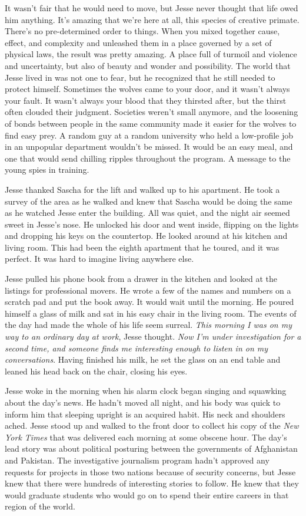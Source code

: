 \documentclass[12pt]{book}
\begin{document}
It wasn't fair that he would need to move, but Jesse never thought that life owed him anything.  It's amazing that we're here at all, this species of creative primate.  There's no pre-determined order to things.  When you mixed together cause, effect, and complexity and unleashed them in a place governed by a set of physical laws, the result was pretty amazing.  A place full of turmoil and violence and uncertainty, but also of beauty and wonder and possibility.  The world that Jesse lived in was not one to fear, but he recognized that he still needed to protect himself.  Sometimes the wolves came to your door, and it wasn't always your fault.  It wasn't always your blood that they thirsted after, but the thirst often clouded their judgment.  Societies weren't small anymore, and the loosening of bonds between people in the same community made it easier for the wolves to find easy prey.  A random guy at a random university who held a low-profile job in an unpopular department wouldn't be missed.  It would be an easy meal, and one that would send chilling ripples throughout the program.  A message to the young spies in training.

Jesse thanked Sascha for the lift and walked up to his apartment.  He took a survey of the area as he walked and knew that Sascha would be doing the same as he watched Jesse enter the building.  All was quiet, and the night air seemed sweet in Jesse's nose.  He unlocked his door and went inside, flipping on the lights and dropping his keys on the countertop.  He looked around at his kitchen and living room.  This had been the eighth apartment that he toured, and it was perfect.  It was hard to imagine living anywhere else.

Jesse pulled his phone book from a drawer in the kitchen and looked at the listings for professional movers.  He wrote a few of the names and numbers on a scratch pad and put the book away.  It would wait until the morning.  He poured himself a glass of milk and sat in his easy chair in the living room.  The events of the day had made the whole of his life seem surreal.  \emph{This morning I was on my way to an ordinary day at work}, Jesse thought.  \emph{Now I'm under investigation for a second time, and someone finds me interesting enough to listen in on my conversations}.  Having finished his milk, he set the glass on an end table and leaned his head back on the chair, closing his eyes.


Jesse woke in the morning when his alarm clock began singing and squawking about the day's news.  He hadn't moved all night, and his body was quick to inform him that sleeping upright is an acquired habit.  His neck and shoulders ached.  Jesse stood up and walked to the front door to collect his copy of the \emph{New York Times} that was delivered each morning at some obscene hour.  The day's lead story was about political posturing between the governments of Afghanistan and Pakistan.  The investigative journalism program hadn't approved any requests for projects in those two nations because of security concerns, but Jesse knew that there were hundreds of interesting stories to follow.  He knew that they would graduate students who would go on to spend their entire careers in that region of the world.
\end{document}
